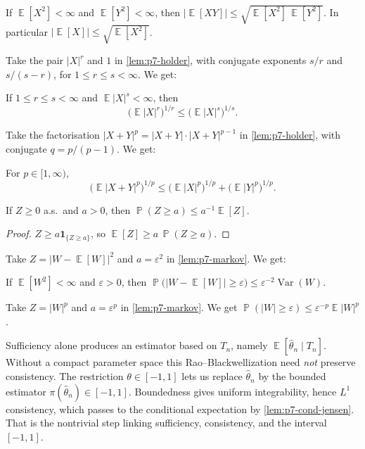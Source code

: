 \documentclass[11pt,a4paper]{article}
\DeclareMathOperator{\Var}{Var}
\DeclareMathOperator{\E}{\mathbb{E}}
\DeclareMathOperator{\Pbb}{\mathbb{P}}
\begin{document}
\begin{lemma}
\label{lem:p7-cs}
If \(\E[X^2]<\infty\) and \(\E[Y^2]<\infty\), then \(\bigl\lvert\E[XY]\bigr\rvert\le\sqrt{\E[X^2]\,\E[Y^2]}\). In particular \(\lvert\E[X]\rvert\le\sqrt{\E[X^2]}\).
\end{lemma}

Take the pair \(\lvert X\rvert^{r}\) and \(1\) in \cref{lem:p7-holder}, with conjugate exponents \(s/r\) and \(s/(s-r)\), for \(1\le r\le s<\infty\). We get:

\begin{lemma}[Lyapunov]
\label{lem:p7-lyapunov}
If \(1\le r\le s<\infty\) and \(\E\lvert X\rvert^s<\infty\), then
\[
\bigl(\E\lvert X\rvert^r\bigr)^{1/r}
\le
\bigl(\E\lvert X\rvert^s\bigr)^{1/s}.
\]
\end{lemma}

Take the factorisation \(\lvert X+Y\rvert^p=\lvert X+Y\rvert\cdot\lvert X+Y\rvert^{p-1}\) in \cref{lem:p7-holder}, with conjugate \(q=p/(p-1)\). We get:

\begin{lemma}[Minkowski]
\label{lem:p7-minkowski}
For \(p\in[1,\infty)\),
\[
\bigl(\E\lvert X+Y\rvert^p\bigr)^{1/p}
\le
\bigl(\E\lvert X\rvert^p\bigr)^{1/p}
+
\bigl(\E\lvert Y\rvert^p\bigr)^{1/p}.
\]
\end{lemma}

\begin{lemma}[Markov]
\label{lem:p7-markov}
If \(Z\ge 0\) a.s.\ and \(a>0\), then \(\Pbb(Z\ge a)\le a^{-1}\E[Z]\).
\end{lemma}

\begin{proof}
\(Z\ge a\mathbf{1}_{\{Z\ge a\}}\), so \(\E[Z]\ge a\,\Pbb(Z\ge a)\).
\end{proof}

Take \(Z=\lvert W-\E[W]\rvert^2\) and \(a=\varepsilon^2\) in \cref{lem:p7-markov}. We get:

\begin{lemma}[Chebyshev]
\label{lem:p7-chebyshev}
If \(\E[W^2]<\infty\) and \(\varepsilon>0\), then \(\Pbb\bigl(\lvert W-\E[W]\rvert\ge\varepsilon\bigr)\le\varepsilon^{-2}\Var(W)\).
\end{lemma}

Take \(Z=\lvert W\rvert^p\) and \(a=\varepsilon^p\) in \cref{lem:p7-markov}. We get \(\Pbb(\lvert W\rvert\ge\varepsilon)\le\varepsilon^{-p}\E\lvert W\rvert^p\).

\begin{remark*}[{Role of $\Theta=[-1,1]$}]
Sufficiency alone produces an estimator based on \(T_n\), namely \(\E[\hat\theta_n\mid T_n]\). Without a compact parameter space this Rao--Blackwellization need \emph{not} preserve consistency. The restriction \(\theta\in[-1,1]\) lets us replace \(\hat\theta_n\) by the bounded estimator \(\pi(\hat\theta_n)\in[-1,1]\). Boundedness gives uniform integrability, hence \(L^1\) consistency, which passes to the conditional expectation by \cref{lem:p7-cond-jensen}. That is the nontrivial step linking sufficiency, consistency, and the interval \([-1,1]\).
\end{remark*}
\end{document}
